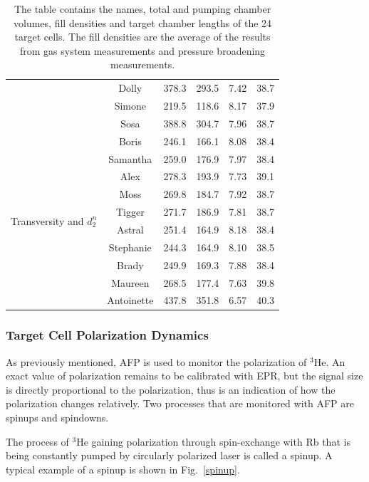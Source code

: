 \begin{table}
\begin{center}
\begin{tabular}{|c|c|c|c|c|c|}
			& Dolly & 378.3 & 293.5 & 7.42 & 38.7\\ \cline{2-6}
			& Simone & 219.5 & 118.6 & 8.17 & 37.9\\ \cline{2-6}
			& Sosa & 388.8 & 304.7 & 7.96 & 38.7\\ \hline
			\multirow{10}{*}{\begin{sideways}Transversity and $d_{2}^{n}$\end{sideways}} 
			& Boris & 246.1 & 166.1 & 8.08 & 38.4\\ \cline{2-6} 
			& Samantha & 259.0 & 176.9 & 7.97 & 38.4\\ \cline{2-6}
			& Alex & 278.3 & 193.9 & 7.73 & 39.1\\ \cline{2-6}
			& Moss & 269.8 & 184.7 & 7.92 & 38.7\\ \cline{2-6}
			& Tigger & 271.7 & 186.9 & 7.81 & 38.7\\ \cline{2-6}
			& Astral & 251.4 & 164.9 & 8.18 & 38.4\\ \cline{2-6}
			& Stephanie & 244.3 & 164.9 & 8.10 & 38.5\\ \cline{2-6}
			& Brady & 249.9 & 169.3 & 7.88 & 38.4\\ \cline{2-6}
			& Maureen & 268.5 & 177.4 & 7.63 & 39.8\\ \cline{2-6}
			& Antoinette & 437.8 & 351.8 & 6.57 & 40.3\\ \hline
		\end{tabular}
	\end{center}
	\caption{The table contains the names, total and pumping chamber volumes, fill densities and target chamber lengths of the 24 target cells. The fill densities are the average of the results from gas system measurements and pressure broadening measurements.}
	\label{fill_densities}
\end{table}

\subsubsection{Target Cell Polarization Dynamics}

As previously mentioned, AFP is used to monitor the polarization of $^{3}$He. An exact value of polarization remains to be calibrated with EPR, but the signal size is directly proportional to the polarization, thus is an indication of how the polarization changes relatively. Two processes that are monitored with AFP are spinups and spindowns. 

The process of $^{3}$He gaining polarization through spin-exchange with Rb that is being constantly pumped by circularly polarized laser is called a spinup. A typical example of a spinup is shown in Fig.~\ref{spinup}.

